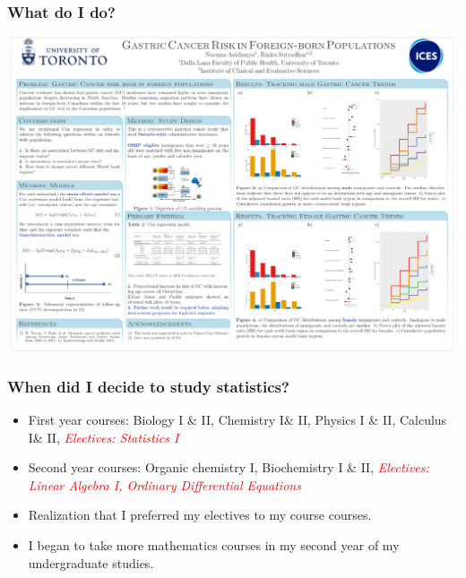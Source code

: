 \documentclass{beamer}
\begin{document}

\begin{frame}
\frametitle{\textbf{What} do I do?}


	\begin{center}
	\includegraphics[width=0.95\linewidth]{gastric.png}
	\begin{figure}[H]
	\end{figure}
\end{center}

\end{frame}



\begin{frame}
\frametitle{\textbf{When} did I decide to study statistics?}
\begin{itemize}
\item First year courses: Biology I \& II, Chemistry I\& II, Physics I \& II, Calculus I\& II, \textit{\textcolor{red}{Electives: Statistics I}}
\item Second year courses: Organic chemistry I, Biochemistry I \& II, \textit{\textcolor{red}{ Electives: Linear Algebra I, Ordinary Differential Equations}}
\item Realization that I preferred my electives to my course courses.  
\item I began to take more mathematics courses in my second year of my undergraduate studies. 
\end{itemize}

\end{frame}
\end{document}
